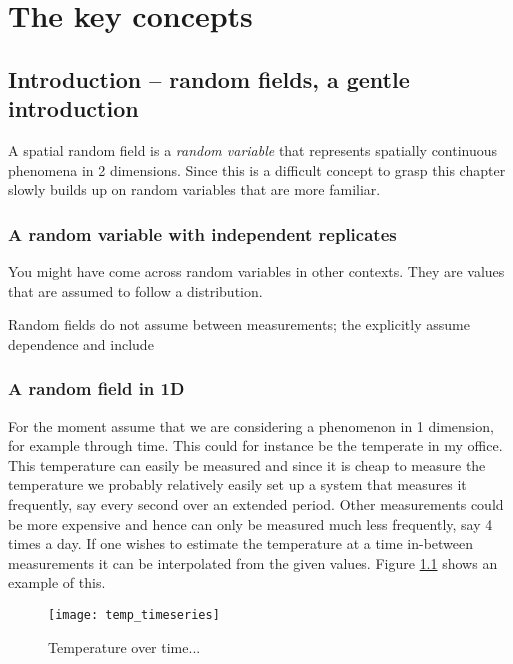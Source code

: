 \chapter{The key concepts}

\section{Introduction -- random fields, a gentle introduction}

A spatial random field is a \textit{random variable} that represents spatially continuous phenomena in 2 dimensions. Since this is a difficult concept to grasp this chapter slowly builds up on random variables that are more familiar.


\subsection{A random variable with independent replicates}

You might have come across random variables in other contexts. They are values that are assumed to follow a distribution. 

Random fields do not assume between measurements; the explicitly assume  dependence and include 

\subsection{A random field in 1D}
For the moment assume that we are considering a phenomenon in 1 dimension, for example through time. This could for instance be the temperate in my office. This temperature can easily be measured and since it is cheap to measure the temperature we probably relatively easily set up a system that measures it frequently, say every second over an extended period.  Other measurements could be more expensive and hence can only be measured much less frequently, say 4 times a day. If one wishes to estimate the temperature at a time in-between measurements it can be interpolated from the given values. Figure \ref{fig:ch2:1D} shows an example of this.



\begin{figure}
\centering
\texttt{[image: temp\_timeseries]}
\caption{\label{fig:ch2:1D} Temperature over time...}
\end{figure}

